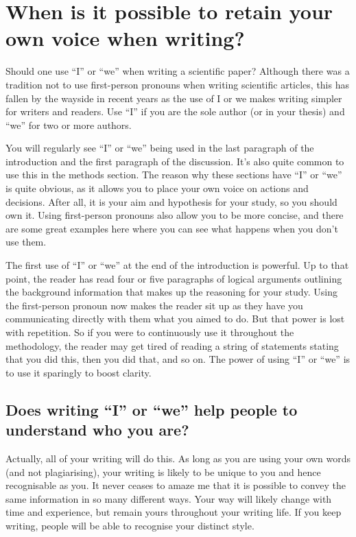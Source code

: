 \documentclass[
]{krantz}
\begin{document}
\hypertarget{voice}{%
\section{When is it possible to retain your own voice when writing?}\label{voice}}

Should one use ``I'' or ``we'' when writing a scientific paper? Although there was a tradition not to use first-person pronouns when writing scientific articles, this has fallen by the wayside in recent years as the use of I or we makes writing simpler for writers and readers. Use ``I'' if you are the sole author (or in your thesis) and ``we'' for two or more authors.

You will regularly see ``I'' or ``we'' being used in the last paragraph of the introduction and the first paragraph of the discussion. It's also quite common to use this in the methods section. The reason why these sections have ``I'' or ``we'' is quite obvious, as it allows you to place your own voice on actions and decisions. After all, it is your aim and hypothesis for your study, so you should own it. Using first-person pronouns also allow you to be more concise, and there are some great examples here where you can see what happens when you don't use them.

The first use of ``I'' or ``we'' at the end of the introduction is powerful. Up to that point, the reader has read four or five paragraphs of logical arguments outlining the background information that makes up the reasoning for your study. Using the first-person pronoun now makes the reader sit up as they have you communicating directly with them what you aimed to do. But that power is lost with repetition. So if you were to continuously use it throughout the methodology, the reader may get tired of reading a string of statements stating that you did this, then you did that, and so on. The power of using ``I'' or ``we'' is to use it sparingly to boost clarity.

\hypertarget{does-writing-i-or-we-help-people-to-understand-who-you-are}{%
\subsection{Does writing ``I'' or ``we'' help people to understand who you are?}\label{does-writing-i-or-we-help-people-to-understand-who-you-are}}

Actually, all of your writing will do this. As long as you are using your own words (and not plagiarising), your writing is likely to be unique to you and hence recognisable as you. It never ceases to amaze me that it is possible to convey the same information in so many different ways. Your way will likely change with time and experience, but remain yours throughout your writing life. If you keep writing, people will be able to recognise your distinct style.
\end{document}
